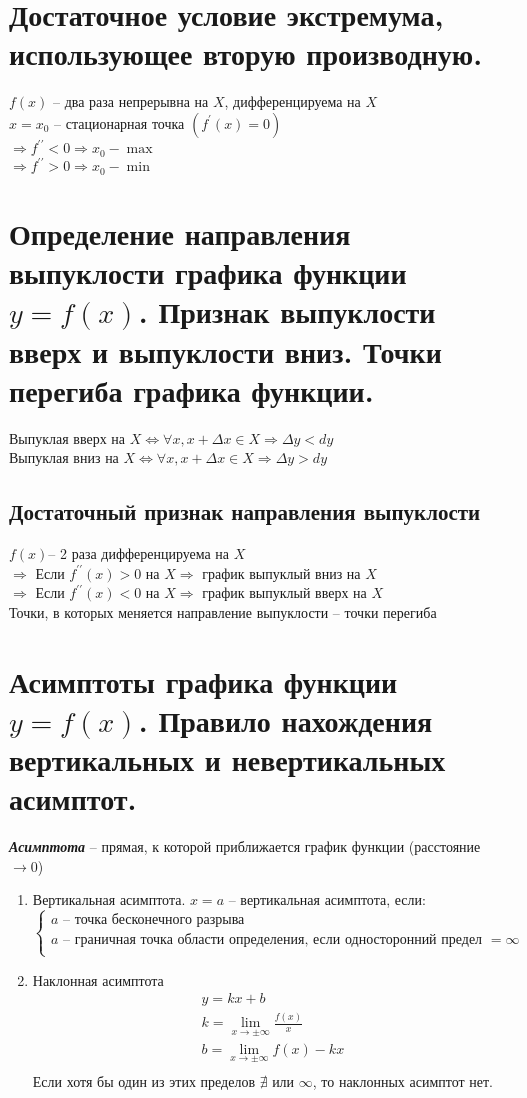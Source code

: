 \documentclass[12pt, fleqn]{article}
\begin{document}
\section{Достаточное условие экстремума, использующее вторую производную.}
$f(x)$ -- два раза непрерывна на $X$, дифференцируема на $X$\\
$x=x_0$ -- стационарная точка $(f^\prime(x)=0)$\\
$\Rightarrow f^{\prime\prime} < 0\Rightarrow x_0 - \max$\\
$\Rightarrow f^{\prime\prime}> 0\Rightarrow x_0 - \min$\\
\section{Определение направления выпуклости графика функции  $y = f (x)$. Признак выпуклости вверх и выпуклости вниз. Точки перегиба графика функции.}
Выпуклая вверх на $X \Leftrightarrow \forall x, x+\varDelta x \in X \Rightarrow\varDelta y<dy$\\
Выпуклая вниз на $X \Leftrightarrow \forall x, x+\varDelta x \in X \Rightarrow\varDelta y>dy$\\
\subsection{Достаточный признак направления выпуклости}
$f(x)$-- 2 раза дифференцируема на $X$\\
$\Rightarrow$ Если $f^{\prime\prime}(x)>0$ на $X \Rightarrow$ график выпуклый вниз на $X$\\
$\Rightarrow$ Если $f^{\prime\prime}(x)<0$ на $X \Rightarrow$ график выпуклый вверх на $X$\\
Точки, в которых меняется направление выпуклости -- точки перегиба
\section{Асимптоты графика функции  $y = f (x)$. Правило нахождения вертикальных и невертикальных асимптот.}
\textbf{\textit{Асимптота}} -- прямая, к которой приближается график функции (расстояние $\to 0 $)
\begin{enumerate}
	\item Вертикальная асимптота.
	$x=a$ -- вертикальная асимптота, если:
	\begin{equation*}
		\begin{cases}
			a \text{ -- точка бесконечного разрыва}\\
			a \text{ -- граничная точка области определения, если односторонний предел } = \infty\\
		\end{cases}
	\end{equation*}
	\item Наклонная асимптота
	\begin{multline*}
		y=kx+b\\
		k=\lim_{x\to \pm \infty}\frac{f(x)}{x}\\
		b = \lim_{x\to \pm \infty}f(x)-kx\\
	\end{multline*}
Если хотя бы один из этих пределов $\nexists$ или $\infty$, то наклонных асимптот нет.
\end{enumerate}
\end{document}
